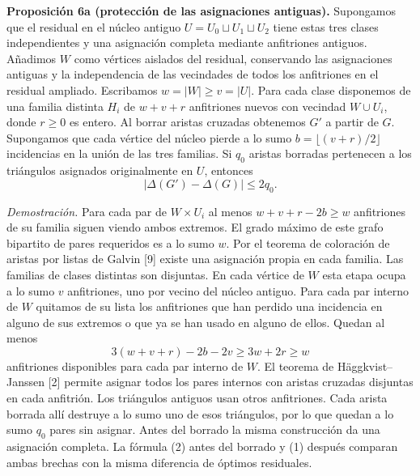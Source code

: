 \documentclass[spanish,11pt,a4paper]{article}
\begin{document}
\textbf{Proposición 6a (protección de las asignaciones antiguas).} Supongamos que el residual en el núcleo antiguo \(U=U_0\sqcup U_1\sqcup U_2\) tiene estas tres clases independientes y una asignación completa mediante anfitriones antiguos. Añadimos \(W\) como vértices aislados del residual, conservando las asignaciones antiguas y la independencia de las vecindades de todos los anfitriones en el residual ampliado. Escribamos \(w=|W|\ge v=|U|\). Para cada clase disponemos de una familia distinta \(H_i\) de \(w+v+r\) anfitriones nuevos con vecindad \(W\cup U_i\), donde \(r\ge0\) es entero. Al borrar aristas cruzadas obtenemos \(G'\) a partir de \(G\). Supongamos que cada vértice del núcleo pierde a lo sumo \(b=\lfloor(v+r)/2\rfloor\) incidencias en la unión de las tres familias. Si \(q_0\) aristas borradas pertenecen a los triángulos asignados originalmente en \(U\), entonces \[
|\Delta(G')-\Delta(G)|\le 2q_0.
\]

\emph{Demostración.} Para cada par de \(W\times U_i\) al menos \(w+v+r-2b\ge w\) anfitriones de su familia siguen viendo ambos extremos. El grado máximo de este grafo bipartito de pares requeridos es a lo sumo \(w\). Por el teorema de coloración de aristas por listas de Galvin {[}9{]} existe una asignación propia en cada familia. Las familias de clases distintas son disjuntas. En cada vértice de \(W\) esta etapa ocupa a lo sumo \(v\) anfitriones, uno por vecino del núcleo antiguo. Para cada par interno de \(W\) quitamos de su lista los anfitriones que han perdido una incidencia en alguno de sus extremos o que ya se han usado en alguno de ellos. Quedan al menos \[
3(w+v+r)-2b-2v\ge 3w+2r\ge w
\] anfitriones disponibles para cada par interno de \(W\). El teorema de Häggkvist--Janssen {[}2{]} permite asignar todos los pares internos con aristas cruzadas disjuntas en cada anfitrión. Los triángulos antiguos usan otros anfitriones. Cada arista borrada allí destruye a lo sumo uno de esos triángulos, por lo que quedan a lo sumo \(q_0\) pares sin asignar. Antes del borrado la misma construcción da una asignación completa. La fórmula (2) antes del borrado y (1) después comparan ambas brechas con la misma diferencia de óptimos residuales.
\end{document}
